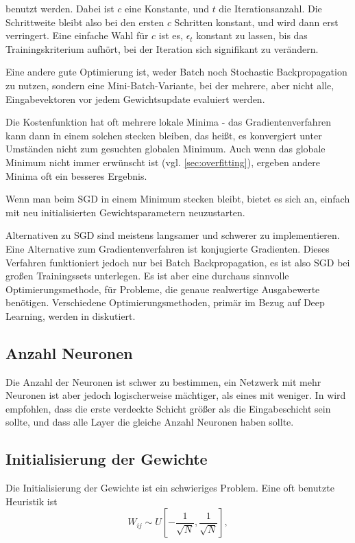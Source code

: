 benutzt werden. Dabei ist $c$ eine Konstante, und $t$ die Iterationsanzahl. Die Schrittweite bleibt also bei den ersten $c$ Schritten konstant, und wird dann erst verringert. Eine einfache Wahl für $c$ ist es, $\epsilon_t$ konstant zu lassen, bis das Trainingskriterium aufhört, bei der Iteration sich signifikant zu verändern.

Eine andere gute Optimierung ist, weder Batch noch Stochastic Backpropagation zu nutzen, sondern eine Mini-Batch-Variante, bei der mehrere, aber nicht alle, Eingabevektoren vor jedem Gewichtsupdate evaluiert werden. 

Die Kostenfunktion hat oft mehrere lokale Minima - das Gradientenverfahren kann dann in einem solchen stecken bleiben, das heißt, es konvergiert unter Umständen nicht zum gesuchten globalen Minimum. Auch wenn das globale Minimum nicht immer erwünscht ist (vgl. \ref{sec:overfitting}), ergeben andere Minima oft ein besseres Ergebnis.

Wenn man beim SGD in einem Minimum stecken bleibt, bietet es sich an, einfach mit neu initialisierten Gewichtsparametern neuzustarten. 

Alternativen zu SGD sind meistens langsamer und schwerer zu implementieren. Eine Alternative zum Gradientenverfahren ist konjugierte Gradienten. Dieses Verfahren funktioniert jedoch nur bei Batch Backpropagation, es ist also SGD bei großen Trainingssets unterlegen. Es ist aber eine durchaus sinnvolle Optimierungsmethode, für Probleme, die genaue realwertige Ausgabewerte benötigen\cite{lecunefficient}.
Verschiedene Optimierungsmethoden, primär im Bezug auf Deep Learning, werden in \cite{ngiam2011optimization} diskutiert.

\subsection{Anzahl Neuronen}
Die Anzahl der Neuronen ist schwer zu bestimmen, ein Netzwerk mit mehr Neuronen ist aber jedoch logischerweise mächtiger, als eines mit weniger. In \cite{bengio2012practical} wird empfohlen, dass die erste verdeckte Schicht größer als die Eingabeschicht sein sollte, und dass alle Layer die gleiche Anzahl Neuronen haben sollte.

\subsection{Initialisierung der Gewichte}
Die Initialisierung der Gewichte ist ein schwieriges Problem. Eine oft benutzte Heuristik ist 
\begin{equation}
	W_{ij} \sim U [ -\frac{1}{\sqrt{N}} , \frac{1}{\sqrt{N}} ],
\end{equation}

